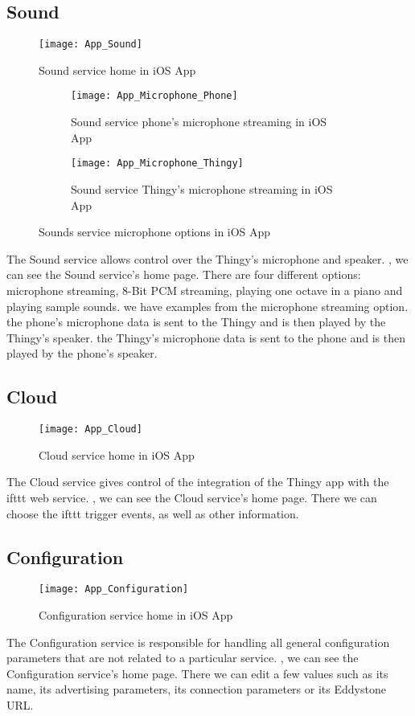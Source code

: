 \subsection{Sound}
\begin{figure}[hbt!]
	\centering
	\texttt{[image: App\_Sound]}
	\caption{Sound service home in iOS App}
	\label{fig:app_sound}
\end{figure}
\begin{figure}[hbt!]
	\begin{subfigure}{.5\textwidth}
		\centering
		\texttt{[image: App\_Microphone\_Phone]}
		\caption{Sound service phone's microphone streaming in iOS App}
		\label{fig:app_sound_phone}
	\end{subfigure}
	\begin{subfigure}{.5\textwidth}
		\centering
		\texttt{[image: App\_Microphone\_Thingy]}
		\caption{Sound service Thingy's microphone streaming in iOS App}
		\label{fig:app_sound_thingy}
	\end{subfigure}
	\caption{Sounds service microphone options in iOS App}
	\label{fig:app_sound_microphone}
\end{figure}
The Sound service allows control over the Thingy's microphone and speaker. , we can see the Sound service's home page. There are four different options: microphone streaming, 8-Bit PCM streaming, playing one octave in a piano and playing sample sounds.  we have examples from the microphone streaming option.  the phone's microphone data is sent to the Thingy and is then played by the Thingy's speaker.  the Thingy's microphone data is sent to the phone and is then played by the phone's speaker.

\subsection{Cloud}
\begin{figure}[hbt!]
	\centering
	\texttt{[image: App\_Cloud]}
	\caption{Cloud service home in iOS App}
	\label{fig:app_cloud}
\end{figure}
The Cloud service gives control of the integration of the Thingy app with the \gls{ifttt} web service. , we can see the Cloud service's home page. There we can choose the \gls{ifttt} trigger events, as well as other information.

\subsection{Configuration}
\begin{figure}[hbt!]
	\centering
	\texttt{[image: App\_Configuration]}
	\caption{Configuration service home in iOS App}
	\label{fig:app_configuration}
\end{figure}
The Configuration service is responsible for handling all general configuration parameters that are not related to a particular service. , we can see the Configuration service's home page. There we can edit a few values such as its name, its advertising parameters, its connection parameters or its Eddystone URL.

